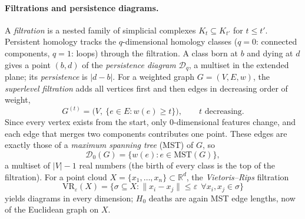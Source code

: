 \documentclass[11pt]{article}
\newcommand{\R}{\mathbb{R}}
\newcommand{\PD}{\mathcal{D}}
\begin{document}
\paragraph{Filtrations and persistence diagrams.}
A \emph{filtration} is a nested family of simplicial complexes $K_{t}\subseteq K_{t'}$ for
$t\le t'$. Persistent homology tracks the $q$-dimensional homology classes ($q=0$: connected
components, $q=1$: loops) through the filtration. A class born at $b$ and dying at $d$ gives a
point $(b,d)$ of the \emph{persistence diagram} $\PD_q$, a multiset in the extended plane; its
\emph{persistence} is $|d-b|$. For a weighted graph $G=(V,E,w)$, the \emph{superlevel
filtration} adds all vertices first and then edges in decreasing order of weight,
\begin{equation}
  G^{(t)} = \bigl(V,\ \{e\in E : w(e)\ge t\}\bigr), \qquad t \text{ decreasing}.
  \label{eq:superlevel}
\end{equation}
Since every vertex exists from the start, only 0-dimensional features change, and each edge that
merges two components contributes one point. These edges are exactly those of a
\emph{maximum spanning tree} (MST) of $G$, so
\begin{equation}
  \PD_0(G) = \bigl\{ w(e) : e \in \mathrm{MST}(G) \bigr\},
  \label{eq:mst}
\end{equation}
a multiset of $|V|-1$ real numbers (the birth of every class is the top of the filtration).
For a point cloud $X=\{x_1,\dots,x_n\}\subset\R^d$, the \emph{Vietoris--Rips} filtration
\begin{equation}
  \mathrm{VR}_\varepsilon(X) = \bigl\{\sigma\subseteq X : \|x_i-x_j\|\le\varepsilon\ \ \forall x_i,x_j\in\sigma\bigr\}
  \label{eq:rips}
\end{equation}
yields diagrams in every dimension; $H_0$ deaths are again MST edge lengths, now of the
Euclidean graph on $X$.
\end{document}
